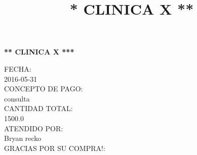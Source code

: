 \documentclass[10pt,a4paper]{letter}
\title{\bf ** CLINICA X **}
\begin{document}
\begin{center}
{\scshape\LARGE \bf *** CLINICA X ***\par}

\end{center}

FECHA:\\ 2016-05-31 \\
CONCEPTO DE PAGO:\\ consulta \\
CANTIDAD TOTAL:\\ 1500.0 \\
ATENDIDO POR:\\ Bryan recko \\
GRACIAS POR SU COMPRA!: \\ \\

 
\end{document}

